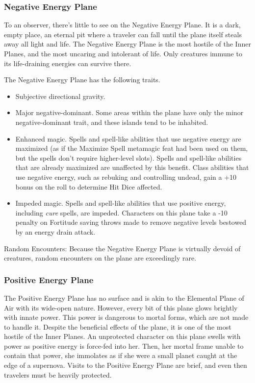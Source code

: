 \subsubsection{Negative Energy Plane}

To an observer, there's little to see on the Negative Energy Plane. It is a dark, 
empty place, an eternal pit where a traveler can fall until the plane itself steals 
away all light and life. The Negative Energy Plane is the most hostile of the Inner 
Planes, and the most uncaring and intolerant of life. Only creatures immune to 
its life-draining energies can survive there. 

The Negative Energy Plane has the following traits.

\begin{itemize}
\item Subjective directional gravity.
\item Major negative-dominant. Some areas within the plane have only the minor negative-dominant 
trait, and these islands tend to be inhabited.
\item Enhanced magic. Spells and spell-like abilities that use negative energy are maximized 
(as if the Maximize Spell metamagic feat had been used on them, but the spells 
don't require higher-level slots). Spells and spell-like abilities that are already 
maximized are unaffected by this benefit. Class abilities that use negative energy, 
such as rebuking and controlling undead, gain a +10 bonus on the roll to determine 
Hit Dice affected. 
\item Impeded magic. Spells and spell-like abilities that use positive energy, including 
\textit{cure} spells, are impeded. Characters on this plane take a -10 penalty 
on Fortitude saving throws made to remove negative levels bestowed by an energy 
drain attack.
\end{itemize}

Random Encounters: Because the Negative Energy Plane is virtually devoid of creatures, 
random encounters on the plane are exceedingly rare.

\subsubsection{Positive Energy Plane}

The Positive Energy Plane has no surface and is akin to the Elemental Plane of 
Air with its wide-open nature. However, every bit of this plane glows brightly 
with innate power. This power is dangerous to mortal forms, which are not made 
to handle it. Despite the beneficial effects of the plane, it is one of the most 
hostile of the Inner Planes. An unprotected character on this plane swells with 
power as positive energy is force-fed into her. Then, her mortal frame unable to 
contain that power, she immolates as if she were a small planet caught at the edge 
of a supernova. Visits to the Positive Energy Plane are brief, and even then travelers 
must be heavily protected.

